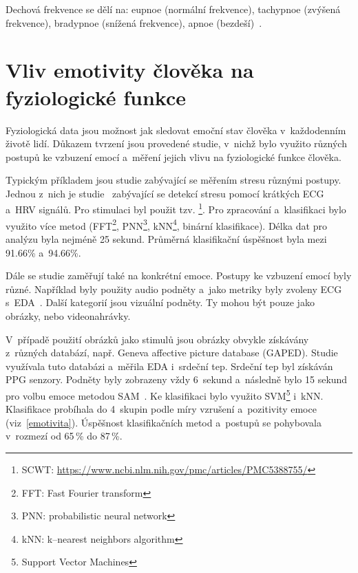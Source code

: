         
        Dechová frekvence se dělí na: eupnoe (normální frekvence), tachypnoe (zvýšená frekvence), bradypnoe (snížená frekvence), apnoe (bezdeší)~\cite{wiki:fyzio_sledovani}.
        
        \section{Vliv emotivity člověka na fyziologické funkce}
        \label{emotion_to_physio}
        Fyziologická data jsou možnost jak sledovat emoční stav člověka v~každodenním životě lidí. Důkazem tvrzení jsou provedené studie, v~nichž bylo využito různých postupů ke vzbuzení emocí a~měření jejich vlivu na fyziologické funkce člověka.
        
        \vspace{3mm}
        
        Typickým příkladem jsou studie zabývající se měřením stresu různými postupy. Jednou z~nich je studie~\cite{detection_stress} zabývající se detekcí stresu pomocí krátkých ECG a~HRV signálů. Pro stimulaci byl použit tzv. \footnote{SCWT: \url{https://www.ncbi.nlm.nih.gov/pmc/articles/PMC5388755/}}. Pro zpracování a~klasifikaci bylo využito více metod (FFT\footnote{FFT: Fast Fourier transform}, PNN\footnote{PNN: probabilistic neural network}, kNN\footnote{kNN: k--nearest neighbors algorithm}, binární klasifikace). Délka dat pro analýzu byla nejméně 25 sekund. Průměrná klasifikační úspěšnost byla mezi 91.66\% a~94.66\%. 
        
        Dále se studie zaměřují také na konkrétní emoce. Postupy ke vzbuzení emocí byly různé. Například byly použity audio podněty a~jako metriky byly zvoleny ECG s~EDA~\cite{audio_stimuli}. Další kategorií jsou vizuální podněty. Ty mohou být pouze jako obrázky, nebo videonahrávky. 
        
        V~případě použití obrázků jako stimulů jsou obrázky obvykle získávány z~různých databází, např. Geneva affective picture database (GAPED). Studie~\cite{wearable_emotion_gaped} využívala tuto databázi a~měřila EDA i~srdeční tep. Srdeční tep byl získáván PPG senzory. Podněty byly zobrazeny vždy 6~sekund a~následně bylo 15 sekund pro volbu emoce metodou SAM~\cite{herbon2006emotions}. Ke klasifikaci bylo využito SVM\footnote{Support Vector Machines} i~kNN. Klasifikace probíhala do 4~skupin podle míry vzrušení a~pozitivity emoce (viz~\ref{emotivita}). Úspěšnost klasifikačních metod a~postupů se pohybovala v~rozmezí od 65\,\% do 87\,\%. 
        

